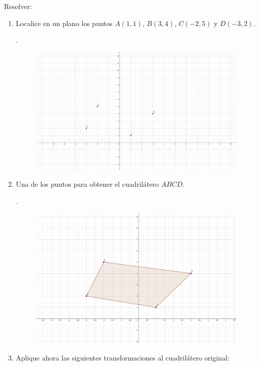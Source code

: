 \begin{problema}
	Resolver:
\begin{enumerate}
	\item Localice en un plano los puntos $A(1,1)$, $B(3,4)$, $C(-2,5)$ y $D(-3,2)$. 
	\begin{sol}.
		\begin{figure}[H]
			\centering
			\includegraphics[scale=0.8]{Images/P1-1}
		\end{figure}
	\end{sol}
	\item Una de los puntos para obtener el cuadrilátero $ABCD$. 
		\begin{sol}
		.
		\begin{figure}[H]
			\centering
			\includegraphics[scale=1]{Images/P1-2}
		\end{figure}
	\end{sol}
	\item Aplique ahora las siguientes transformaciones al cuadrilátero original: 

\end{enumerate}
\end{problema}
